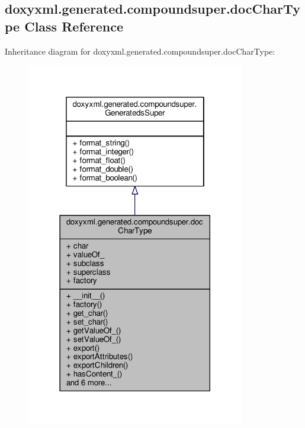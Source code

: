 \subsection{doxyxml.\+generated.\+compoundsuper.\+doc\+Char\+Type Class Reference}
\label{classdoxyxml_1_1generated_1_1compoundsuper_1_1docCharType}


Inheritance diagram for doxyxml.\+generated.\+compoundsuper.\+doc\+Char\+Type\+:
\nopagebreak
\begin{figure}[H]
\begin{center}
\leavevmode
\includegraphics[width=270pt]{d5/d8b/classdoxyxml_1_1generated_1_1compoundsuper_1_1docCharType__inherit__graph}
\end{center}
\end{figure}


